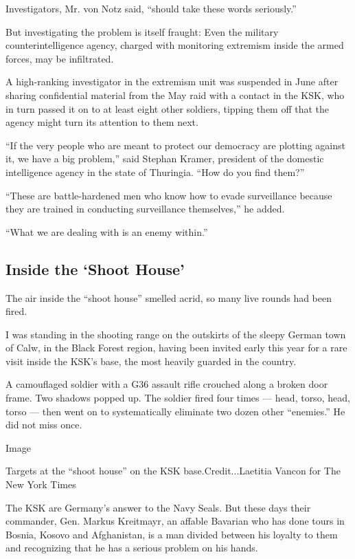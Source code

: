Investigators, Mr. von Notz said, ``should take these words seriously.''

But investigating the problem is itself fraught: Even the military
counterintelligence agency, charged with monitoring extremism inside the
armed forces, may be infiltrated.

A high-ranking investigator in the extremism unit was suspended in June
after sharing confidential material from the May raid with a contact in
the KSK, who in turn passed it on to at least eight other soldiers,
tipping them off that the agency might turn its attention to them next.

``If the very people who are meant to protect our democracy are plotting
against it, we have a big problem,'' said Stephan Kramer, president of
the domestic intelligence agency in the state of Thuringia. ``How do you
find them?''

``These are battle-hardened men who know how to evade surveillance
because they are trained in conducting surveillance themselves,'' he
added.

``What we are dealing with is an enemy within.''

\hypertarget{inside-the-shoot-house}{%
\subsection{Inside the `Shoot House'}\label{inside-the-shoot-house}}

The air inside the ``shoot house'' smelled acrid, so many live rounds
had been fired.

I was standing in the shooting range on the outskirts of the sleepy
German town of Calw, in the Black Forest region, having been invited
early this year for a rare visit inside the KSK's base, the most heavily
guarded in the country.

A camouflaged soldier with a G36 assault rifle crouched along a broken
door frame. Two shadows popped up. The soldier fired four times ---
head, torso, head, torso --- then went on to systematically eliminate
two dozen other ``enemies.'' He did not miss once.

Image

Targets at the ``shoot house'' on the KSK base.Credit...Laetitia Vancon
for The New York Times

The KSK are Germany's answer to the Navy Seals. But these days their
commander, Gen. Markus Kreitmayr, an affable Bavarian who has done tours
in Bosnia, Kosovo and Afghanistan, is a man divided between his loyalty
to them and recognizing that he has a serious problem on his hands.

